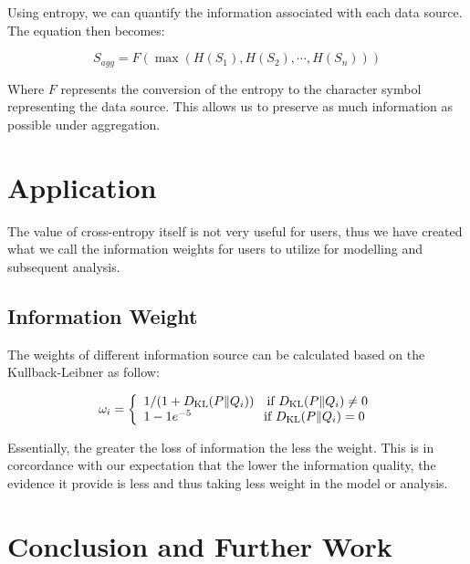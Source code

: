 \documentclass[nojss]{jss}
\begin{document}
Using entropy, we can quantify the information associated with each
data source. The equation then becomes:

\begin{equation}
S_{agg} = F(\max(H(S_{1}), H(S_{2}), \cdots, H(S_{n})))
\end{equation}

Where $F$ represents the conversion of the entropy to the character
symbol representing the data source. This allows us to preserve as
much information as possible under aggregation.


\section{Application}

The value of cross-entropy itself is not very useful for users, thus
we have created what we call the information weights for users to
utilize for modelling and subsequent analysis.

\subsection{Information Weight}
The weights of different information source can be calculated based on
the Kullback-Leibner as follow:

\begin{equation*}
  \omega_i = \left\{
  \begin{array}{l r}
    1/(1 + D_{\mathrm{KL}}(P\|Q_i)) \quad \text{if $D_{\mathrm{KL}}(P\|Q_i) \ne 0$}\\
    1 - 1e^{-5} \, \, \, \, \quad \quad \quad \quad \quad \text{if $D_{\mathrm{KL}}(P\|Q_i) = 0$}
  \end{array} \right.
\end{equation*}


Essentially, the greater the loss of information the less the
weight. This is in corcordance with our expectation that the lower the
information quality, the evidence it provide is less and thus taking
less weight in the model or analysis.










\section{Conclusion and Further Work}
\end{document}
